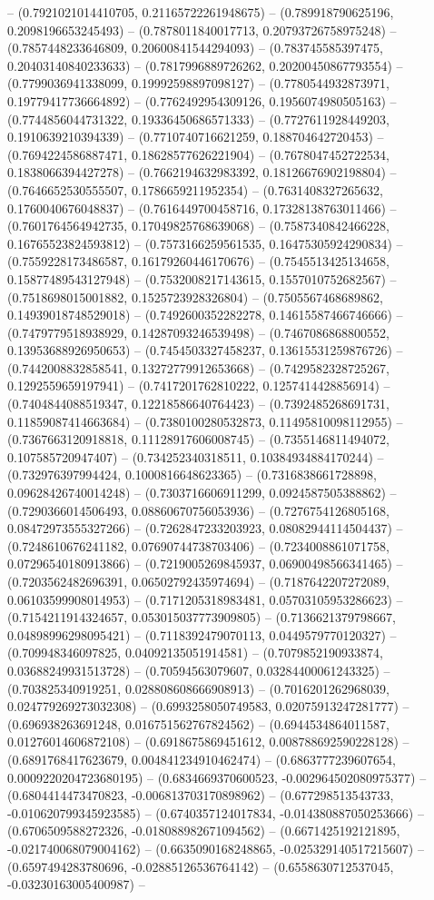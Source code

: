 -- (0.7921021014410705, 0.21165722261948675) -- (0.789918790625196, 0.2098196653245493) -- (0.7878011840017713, 0.20793726758975248) -- (0.7857448233646809, 0.20600841544294093) -- (0.783745585397475, 0.20403140840233633) -- (0.7817996889726262, 0.20200450867793554) -- (0.7799036941338099, 0.19992598897098127) -- (0.7780544932873971, 0.19779417736664892) -- (0.7762492954309126, 0.1956074980505163) -- (0.7744856044731322, 0.19336450686571333) -- (0.7727611928449203, 0.1910639210394339) -- (0.7710740716621259, 0.188704642720453) -- (0.7694224586887471, 0.18628577626221904) -- (0.7678047452722534, 0.1838066394427278) -- (0.7662194632983392, 0.18126676902198804) -- (0.7646652530555507, 0.1786659211952354) -- (0.7631408327265632, 0.1760040676048837) -- (0.7616449700458716, 0.17328138763011466) -- (0.7601764564942735, 0.17049825768639068) -- (0.7587340842466228, 0.16765523824593812) -- (0.7573166259561535, 0.16475305924290834) -- (0.7559228173486587, 0.16179260446170676) -- (0.7545513425134658, 0.15877489543127948) -- (0.7532008217143615, 0.1557010752682567) -- (0.7518698015001882, 0.1525723928326804) -- (0.7505567468689862, 0.14939018748529018) -- (0.7492600352282278, 0.14615587466746666) -- (0.7479779518938929, 0.14287093246539498) -- (0.7467086868800552, 0.13953688926950653) -- (0.7454503327458237, 0.13615531259876726) -- (0.7442008832858541, 0.13272779912653668) -- (0.7429582328725267, 0.1292559659197941) -- (0.7417201762810222, 0.1257414428856914) -- (0.7404844088519347, 0.12218586640764423) -- (0.7392485268691731, 0.11859087414663684) -- (0.7380100280532873, 0.11495810098112955) -- (0.7367663120918818, 0.11128917606008745) -- (0.7355146811494072, 0.107585720947407) -- (0.734252340318511, 0.10384934884170244) -- (0.732976397994424, 0.1000816648623365) -- (0.7316838661728898, 0.09628426740014248) -- (0.7303716606911299, 0.0924587505388862) -- (0.7290366014506493, 0.08860670756053936) -- (0.7276754126805168, 0.08472973555327266) -- (0.7262847233203923, 0.08082944114504437) -- (0.7248610676241182, 0.07690744738703406) -- (0.7234008861071758, 0.07296540180913866) -- (0.7219005269845937, 0.06900498566341465) -- (0.7203562482696391, 0.06502792435974694) -- (0.7187642207272089, 0.06103599908014953) -- (0.7171205318983481, 0.05703105953286623) -- (0.7154211914324657, 0.053015037773909805) -- (0.7136621379798667, 0.04898996298095421) -- (0.7118392479070113, 0.0449579770120327) -- (0.709948346097825, 0.04092135051914581) -- (0.7079852190933874, 0.03688249931513728) -- (0.70594563079607, 0.03284400061243325) -- (0.703825340919251, 0.028808608666908913) -- (0.7016201262968039, 0.024779269273032308) -- (0.6993258050749583, 0.02075913247281777) -- (0.696938263691248, 0.016751562767824562) -- (0.6944534864011587, 0.01276014606872108) -- (0.6918675869451612, 0.008788692590228128) -- (0.6891768417623679, 0.004841234910462474) -- (0.6863777239607654, 0.0009220204723680195) -- (0.6834669370600523, -0.002964502080975377) -- (0.6804414473470823, -0.006813703170898962) -- (0.677298513543733, -0.010620799345923585) -- (0.6740357124017834, -0.014380887050253666) -- (0.6706509588272326, -0.018088982671094562) -- (0.6671425192121895, -0.021740068079004162) -- (0.6635090168248865, -0.025329140517215607) -- (0.6597494283780696, -0.02885126536764142) -- (0.6558630712537045, -0.03230163005400987) -- 